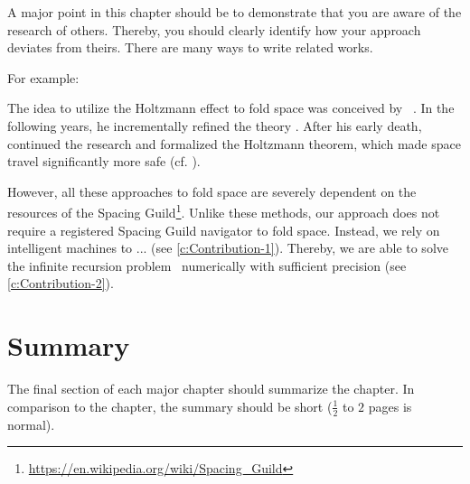 
A major point in this chapter should be to demonstrate that you are aware of the research of others. Thereby, you should clearly identify how your approach deviates from theirs. There are many ways to write related works.

For example:

The idea to utilize the Holtzmann effect to fold space was conceived \citeyear{HerbertF:1965:Dune} by \citeauthor{HerbertF:1965:Dune}~\cite{HerbertF:1965:Dune}. In the following years, he incrementally refined the theory \cite{HerbertF:1981:God-Emperor,HerbertF:1984:Heretics,Herbert:1985:Chapterhouse}. After his early death, \citeauthor{HerbertB:1999:Atreides}~\cite{HerbertB:1999:Atreides} continued the research and formalized the Holtzmann theorem, which made space travel significantly more safe (cf. \cite{HerbertB:2000:Harkonnen,HerbertB:2001:Corrino,HerbertB:2002:Butlerian-Jihad,HerbertB:2003:Machine-Crusade,HerbertB:2004:Battle-of-Corrin}).

However, all these approaches to fold space are severely dependent on the resources of the Spacing Guild\footnote{\url{https://en.wikipedia.org/wiki/Spacing_Guild}}. Unlike these methods, our approach does not require a registered Spacing Guild navigator to fold space. Instead, we rely on intelligent machines to ... (see \autoref{c:Contribution-1}). Thereby, we are able to solve the infinite recursion problem~\cite{HerbertB:2000:Harkonnen} numerically with sufficient precision (see \autoref{c:Contribution-2}).


\section{Summary}
\label{s:Related-Works-Summary}

The final section of each major chapter should summarize the chapter. In comparison to the chapter, the summary should be short ($\frac{1}{2}$ to $2$ pages is normal).